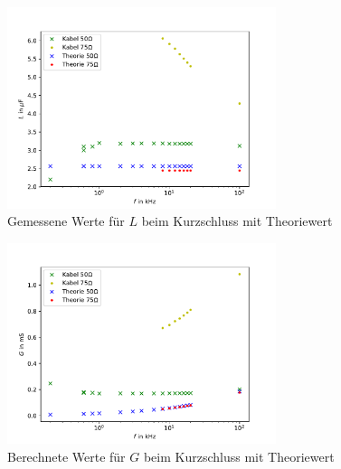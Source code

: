 \begin{figure}[h]
	\centering
	\includegraphics[width=0.7\textwidth]{RLC_DirekteMessung/build/PlotL.pdf}
	\caption[Werte für $L$]{Gemessene Werte für $L$ beim Kurzschluss mit Theoriewert}
	\label{fig:PlotL}
\end{figure}
\begin{figure}[h]
	\centering
	\includegraphics[width=0.7\textwidth]{RLC_DirekteMessung/build/PlotG.pdf}
	\caption[Werte für $G$]{Berechnete Werte für $G$ beim Kurzschluss mit Theoriewert}
	\label{fig:PlotG}
\end{figure}
